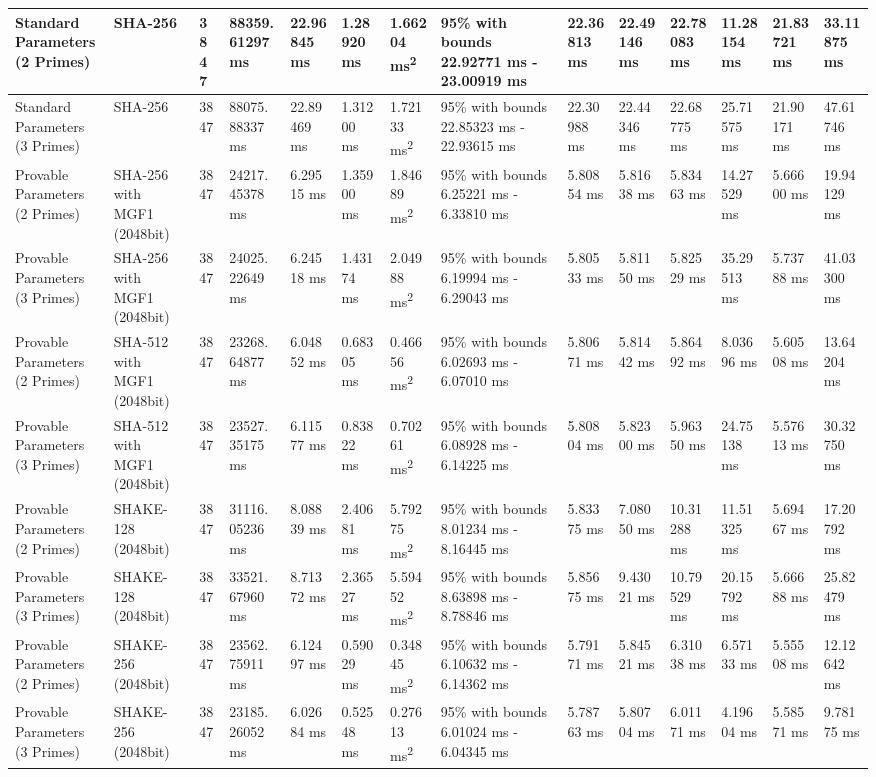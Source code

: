 \documentclass[]{final_report}
\theoremstyle{definition}
\begin{document}
\begin{landscape}
\begin{longtable}{|p{2.3cm}|p{1.8cm}|p{1.0cm}|p{1.7cm}|p{1.4cm}|p{1.5cm}|p{1.8cm}|p{1.5cm}|p{1.43cm}|p{1.5cm}|p{1.3cm}|p{1.4cm}|p{1.3cm}|p{1.3cm}|}
\hline
\endlastfoot
Standard Parameters (2 Primes) & SHA-256 & 3847 & 88359.
61297 ms & 22.96845 ms & 1.28920 ms & 1.66204 ms\textsuperscript{2} & 95\% with bounds 22.92771 ms - 23.00919 ms & 22.36813 ms & 22.49146 ms & 22.78083 ms & 11.28154 ms & 21.83721 ms & 33.11875 ms \\
\hline
Standard Parameters (3 Primes) & SHA-256 & 3847 & 88075.
88337 ms & 22.89469 ms & 1.31200 ms & 1.72133 ms\textsuperscript{2} & 95\% with bounds 22.85323 ms - 22.93615 ms & 22.30988 ms & 22.44346 ms & 22.68775 ms & 25.71575 ms & 21.90171 ms & 47.61746 ms \\
\hline
Provable Parameters (2 Primes) & SHA-256 with MGF1 (2048bit) & 3847 & 24217.
45378 ms & 6.29515 ms & 1.35900 ms & 1.84689 ms\textsuperscript{2} & 95\% with bounds 6.25221 ms - 6.33810 ms & 5.80854 ms & 5.81638 ms & 5.83463 ms & 14.27529 ms & 5.66600 ms & 19.94129 ms \\
\hline
Provable Parameters (3 Primes) & SHA-256 with MGF1 (2048bit) & 3847 & 24025.
22649 ms & 6.24518 ms & 1.43174 ms & 2.04988 ms\textsuperscript{2} & 95\% with bounds 6.19994 ms - 6.29043 ms & 5.80533 ms & 5.81150 ms & 5.82529 ms & 35.29513 ms & 5.73788 ms & 41.03300 ms \\
\hline
Provable Parameters (2 Primes) & SHA-512 with MGF1 (2048bit) & 3847 & 23268.
64877 ms & 6.04852 ms & 0.68305 ms & 0.46656 ms\textsuperscript{2} & 95\% with bounds 6.02693 ms - 6.07010 ms & 5.80671 ms & 5.81442 ms & 5.86492 ms & 8.03696 ms & 5.60508 ms & 13.64204 ms \\
\hline
Provable Parameters (3 Primes) & SHA-512 with MGF1 (2048bit) & 3847 & 23527.
35175 ms & 6.11577 ms & 0.83822 ms & 0.70261 ms\textsuperscript{2} & 95\% with bounds 6.08928 ms - 6.14225 ms & 5.80804 ms & 5.82300 ms & 5.96350 ms & 24.75138 ms & 5.57613 ms & 30.32750 ms \\
\hline
Provable Parameters (2 Primes) & SHAKE-128 (2048bit) & 3847 & 31116.
05236 ms & 8.08839 ms & 2.40681 ms & 5.79275 ms\textsuperscript{2} & 95\% with bounds 8.01234 ms - 8.16445 ms & 5.83375 ms & 7.08050 ms & 10.31288 ms & 11.51325 ms & 5.69467 ms & 17.20792 ms \\
\hline
Provable Parameters (3 Primes) & SHAKE-128 (2048bit) & 3847 & 33521.
67960 ms & 8.71372 ms & 2.36527 ms & 5.59452 ms\textsuperscript{2} & 95\% with bounds 8.63898 ms - 8.78846 ms & 5.85675 ms & 9.43021 ms & 10.79529 ms & 20.15792 ms & 5.66688 ms & 25.82479 ms \\
\hline
Provable Parameters (2 Primes) & SHAKE-256 (2048bit) & 3847 & 23562.
75911 ms & 6.12497 ms & 0.59029 ms & 0.34845 ms\textsuperscript{2} & 95\% with bounds 6.10632 ms - 6.14362 ms & 5.79171 ms & 5.84521 ms & 6.31038 ms & 6.57133 ms & 5.55508 ms & 12.12642 ms \\
\hline
Provable Parameters (3 Primes) & SHAKE-256 (2048bit) & 3847 & 23185.
26052 ms & 6.02684 ms & 0.52548 ms & 0.27613 ms\textsuperscript{2} & 95\% with bounds 6.01024 ms - 6.04345 ms & 5.78763 ms & 5.80704 ms & 6.01171 ms & 4.19604 ms & 5.58571 ms & 9.78175 ms \\
\hline


\end{longtable}
\end{landscape}
\end{document}
